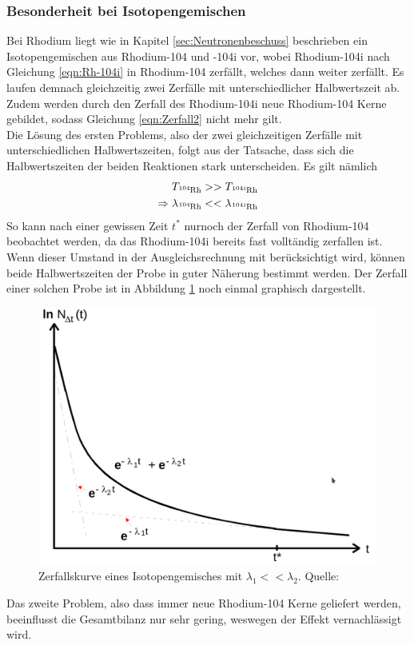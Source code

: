 \subsubsection*{Besonderheit bei Isotopengemischen}
Bei Rhodium liegt wie in Kapitel \ref{sec:Neutronenbeschuss} beschrieben ein Isotopengemischen aus Rhodium-104 
und -104i vor, wobei Rhodium-104i nach Gleichung \ref{eqn:Rh-104i} in Rhodium-104 zerfällt, welches 
dann weiter zerfällt. Es laufen demnach gleichzeitig zwei Zerfälle mit unterschiedlicher Halbwertszeit
ab. Zudem werden durch den Zerfall des Rhodium-104i neue Rhodium-104 Kerne gebildet, sodass Gleichung
\ref{eqn:Zerfall2} nicht mehr gilt.\\
Die Lösung des ersten Problems, also der zwei gleichzeitigen Zerfälle mit unterschiedlichen 
Halbwertszeiten, folgt aus der Tatsache, dass sich die Halbwertszeiten der beiden Reaktionen stark 
unterscheiden. Es gilt nämlich
\begin{align*}
    T_{\ce{^{104}Rh}}>>T_{\ce{^{104i}Rh}}\\
    \Rightarrow
    \lambda_{\ce{^{104}Rh}}<<\lambda_{\ce{^{104i}Rh}}
\end{align*}
So kann nach einer gewissen Zeit $t^*$ nurnoch der Zerfall von Rhodium-104 beobachtet werden, da das 
Rhodium-104i bereits fast volltändig zerfallen ist. Wenn dieser Umstand in der Ausgleichsrechnung 
mit berücksichtigt wird, können beide Halbwertszeiten der Probe in guter Näherung bestimmt werden.
Der Zerfall einer solchen Probe ist in Abbildung \ref{fig:Isotopengemisch} noch einmal graphisch 
dargestellt. 
\begin{figure}[H]
    \centering
    \includegraphics[scale=0.5]{content/Isotopengemisch.png}
    \caption{Zerfallskurve eines Isotopengemisches mit $\lambda_1<<\lambda_2$. Quelle:\cite{AP01}}
    \label{fig:Isotopengemisch}
  \end{figure}
\noindent Das zweite Problem, also dass immer neue Rhodium-104 Kerne geliefert werden, beeinflusst die 
Gesamtbilanz nur sehr gering, weswegen der Effekt vernachlässigt wird. 